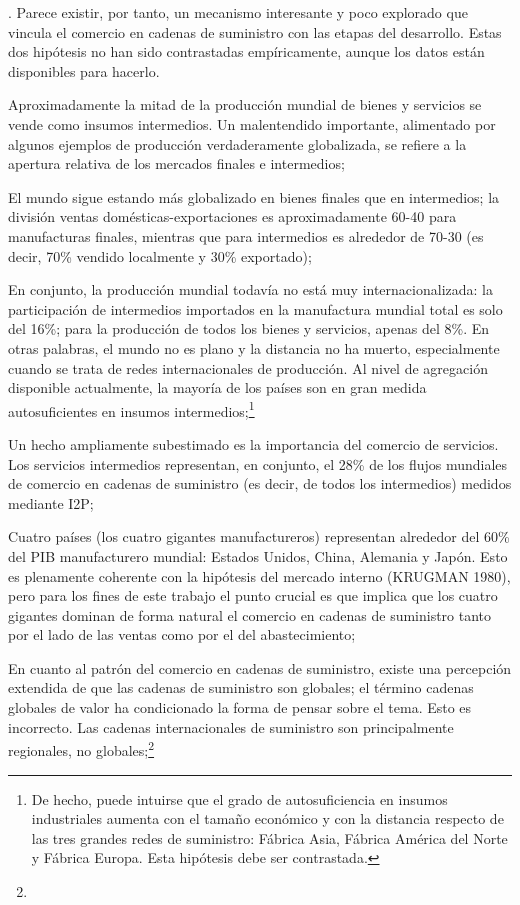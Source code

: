 \documentclass[10pt,a4paper]{article}
\newcounter{numitem}
\newenvironment{lnum}
      {\begin{list}{\arabic{numitem}.}{%
          \usecounter{numitem}%
          \setlength{\leftmargin}{1cm}%
          \setlength{\parskip}{3pt}%
          \setlength{\itemsep}{0pt}%
          \setlength{\parsep}{0pt}%
      }}
      {\end{list}}
\begin{document}
\begin{lnum}
{    Parece existir, por tanto, un mecanismo interesante y poco explorado que vincula el comercio en cadenas de suministro con las etapas del desarrollo. Estas dos hipótesis no han sido contrastadas empíricamente, aunque los datos están disponibles para hacerlo.
    }
    \item Aproximadamente la mitad de la producción mundial de bienes y servicios se vende como insumos intermedios. Un malentendido importante, alimentado por algunos ejemplos de producción verdaderamente globalizada, se refiere a la apertura relativa de los mercados finales e intermedios;
    \item El mundo sigue estando más globalizado en bienes finales que en intermedios; la división ventas domésticas-exportaciones es aproximadamente 60-40 para manufacturas finales, mientras que para intermedios es alrededor de 70-30 (es decir, 70\% vendido localmente y 30\% exportado);
    \item En conjunto, la producción mundial todavía no está muy internacionalizada: la participación de intermedios importados en la manufactura mundial total es solo del 16\%; para la producción de todos los bienes y servicios, apenas del 8\%. En otras palabras, el mundo no es plano y la distancia no ha muerto, especialmente cuando se trata de redes internacionales de producción. Al nivel de agregación disponible actualmente, la mayoría de los países son en gran medida autosuficientes en insumos intermedios;\footnote{%
        De hecho, puede intuirse que el grado de autosuficiencia en insumos industriales aumenta con el tamaño económico y con la distancia respecto de las tres grandes redes de suministro: Fábrica Asia, Fábrica América del Norte y Fábrica Europa. Esta hipótesis debe ser contrastada.
    }
    \item Un hecho ampliamente subestimado es la importancia del comercio de servicios. Los servicios intermedios representan, en conjunto, el 28\% de los flujos mundiales de comercio en cadenas de suministro (es decir, de todos los intermedios) medidos mediante I2P;
    \item Cuatro países (los cuatro gigantes manufactureros) representan alrededor del 60\% del PIB manufacturero mundial: Estados Unidos, China, Alemania y Japón. Esto es plenamente coherente con la hipótesis del mercado interno (KRUGMAN 1980), pero para los fines de este trabajo el punto crucial es que implica que los cuatro gigantes dominan de forma natural el comercio en cadenas de suministro tanto por el lado de las ventas como por el del abastecimiento;
    \item En cuanto al patrón del comercio en cadenas de suministro, existe una percepción extendida de que las cadenas de suministro son globales; el término cadenas globales de valor ha condicionado la forma de pensar sobre el tema. Esto es incorrecto. Las cadenas internacionales de suministro son principalmente regionales, no globales;\footnote{%
}
\end{lnum}
\end{document}
